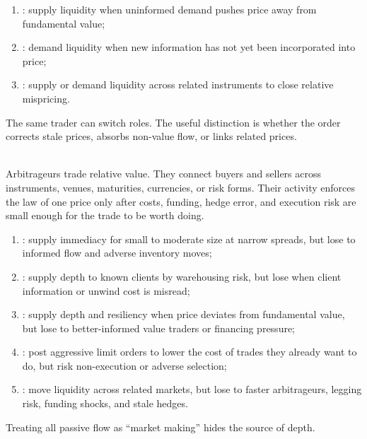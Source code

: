 \begin{taxonomy} 
\begin{enumerate}[label=\roman*.]
\setlength{\itemsep}{0pt}
\item {}: supply liquidity when uninformed demand pushes price away from fundamental value;
\item {}: demand liquidity when new information has not yet been incorporated into price;
\item {}: supply or demand liquidity across related instruments to close relative mispricing.
\end{enumerate}
The same trader can switch roles. The useful distinction is whether the order corrects stale prices, absorbs non-value flow, or links related prices.
\end{taxonomy}

\begin{mechanism} \\
Arbitrageurs trade relative value. They connect buyers and sellers across instruments, venues, maturities, currencies, or risk forms. Their activity enforces the law of one price only after costs, funding, hedge error, and execution risk are small enough for the trade to be worth doing.
\end{mechanism}

\begin{taxonomy} 
\begin{enumerate}[label=\roman*.]
\setlength{\itemsep}{0pt}
\item {}: supply immediacy for small to moderate size at narrow spreads, but lose to informed flow and adverse inventory moves;
\item {}: supply depth to known clients by warehousing risk, but lose when client information or unwind cost is misread;
\item {}: supply depth and resiliency when price deviates from fundamental value, but lose to better-informed value traders or financing pressure;
\item {}: post aggressive limit orders to lower the cost of trades they already want to do, but risk non-execution or adverse selection;
\item {}: move liquidity across related markets, but lose to faster arbitrageurs, legging risk, funding shocks, and stale hedges.
\end{enumerate}
Treating all passive flow as ``market making'' hides the source of depth.
\end{taxonomy}

